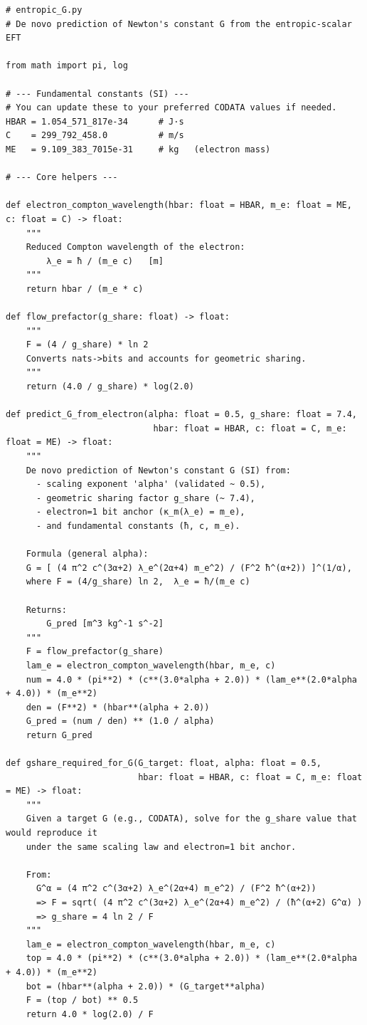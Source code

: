 \documentclass[11pt]{article}
\begin{document}
\begin{verbatim}
# entropic_G.py
# De novo prediction of Newton's constant G from the entropic-scalar EFT

from math import pi, log

# --- Fundamental constants (SI) ---
# You can update these to your preferred CODATA values if needed.
HBAR = 1.054_571_817e-34      # J·s
C    = 299_792_458.0          # m/s
ME   = 9.109_383_7015e-31     # kg   (electron mass)

# --- Core helpers ---

def electron_compton_wavelength(hbar: float = HBAR, m_e: float = ME, c: float = C) -> float:
    """
    Reduced Compton wavelength of the electron:
        λ_e = ħ / (m_e c)   [m]
    """
    return hbar / (m_e * c)

def flow_prefactor(g_share: float) -> float:
    """
    F = (4 / g_share) * ln 2
    Converts nats->bits and accounts for geometric sharing.
    """
    return (4.0 / g_share) * log(2.0)

def predict_G_from_electron(alpha: float = 0.5, g_share: float = 7.4,
                             hbar: float = HBAR, c: float = C, m_e: float = ME) -> float:
    """
    De novo prediction of Newton's constant G (SI) from:
      - scaling exponent 'alpha' (validated ~ 0.5),
      - geometric sharing factor g_share (~ 7.4),
      - electron=1 bit anchor (κ_m(λ_e) = m_e),
      - and fundamental constants (ħ, c, m_e).

    Formula (general alpha):
    G = [ (4 π^2 c^(3α+2) λ_e^(2α+4) m_e^2) / (F^2 ħ^(α+2)) ]^(1/α),
    where F = (4/g_share) ln 2,  λ_e = ħ/(m_e c)

    Returns:
        G_pred [m^3 kg^-1 s^-2]
    """
    F = flow_prefactor(g_share)
    lam_e = electron_compton_wavelength(hbar, m_e, c)
    num = 4.0 * (pi**2) * (c**(3.0*alpha + 2.0)) * (lam_e**(2.0*alpha + 4.0)) * (m_e**2)
    den = (F**2) * (hbar**(alpha + 2.0))
    G_pred = (num / den) ** (1.0 / alpha)
    return G_pred

def gshare_required_for_G(G_target: float, alpha: float = 0.5,
                          hbar: float = HBAR, c: float = C, m_e: float = ME) -> float:
    """
    Given a target G (e.g., CODATA), solve for the g_share value that would reproduce it
    under the same scaling law and electron=1 bit anchor.

    From:
      G^α = (4 π^2 c^(3α+2) λ_e^(2α+4) m_e^2) / (F^2 ħ^(α+2))
      => F = sqrt( (4 π^2 c^(3α+2) λ_e^(2α+4) m_e^2) / (ħ^(α+2) G^α) )
      => g_share = 4 ln 2 / F
    """
    lam_e = electron_compton_wavelength(hbar, m_e, c)
    top = 4.0 * (pi**2) * (c**(3.0*alpha + 2.0)) * (lam_e**(2.0*alpha + 4.0)) * (m_e**2)
    bot = (hbar**(alpha + 2.0)) * (G_target**alpha)
    F = (top / bot) ** 0.5
    return 4.0 * log(2.0) / F


\end{verbatim}
\end{document}
